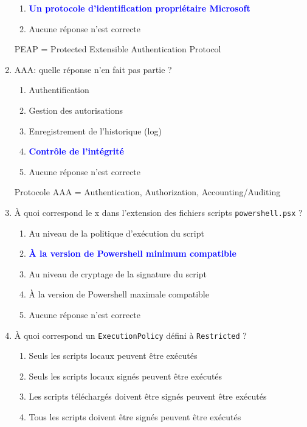 \documentclass[a4paper]{article}
\begin{document}
\begin{enumerate}
\begin{enumerate}
        \item \textcolor{blue}{\textbf{Un protocole d'identification propriétaire Microsoft}}
        \item Aucune réponse n'est correcte
    \end{enumerate}
    \begin{example} PEAP = Protected Extensible Authentication Protocol \end{example}
    \item AAA: quelle réponse n'en fait pas partie ?
    \begin{enumerate}
        \item Authentification
        \item Gestion des autorisations
        \item Enregistrement de l'historique (log)
        \item \textcolor{blue}{\textbf{Contrôle de l'intégrité}}
        \item Aucune réponse n'est correcte
    \end{enumerate}
    \begin{example} Protocole AAA = Authentication, Authorization, Accounting/Auditing \end{example}
    \item À quoi correspond le x dans l'extension des fichiers scripts \texttt{powershell.psx} ?
    \begin{enumerate}
        \item Au niveau de la politique d'exécution du script
        \item \textcolor{blue}{\textbf{À la version de Powershell minimum compatible}}
        \item Au niveau de cryptage de la signature du script
        \item À la version de Powershell maximale compatible
        \item Aucune réponse n'est correcte
    \end{enumerate}
    \item À quoi correspond un \texttt{ExecutionPolicy} défini à \texttt{Restricted} ?
    \begin{enumerate}
        \item Seuls les scripts locaux peuvent être exécutés
        \item Seuls les scripts locaux signés peuvent être exécutés
        \item Les scripts téléchargés doivent être signés peuvent être exécutés
        \item Tous les scripts doivent être signés peuvent être exécutés

\end{enumerate}
\end{enumerate}
\end{document}
